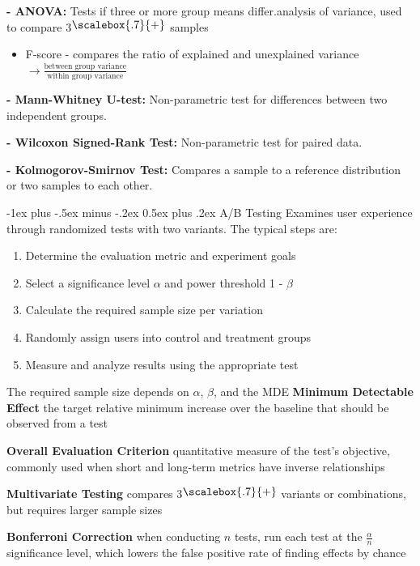 \documentclass[10pt,landscape]{article}
\makeatletter
\newcommand{\plus}{\raisebox{.3\height}{\scalebox{.7}{+}}}
\renewcommand{\section}{\@startsection{section}{1}{0mm}%
                                {-1ex plus -.5ex minus -.2ex}%
                                {0.5ex plus .2ex}%
                                {\normalfont\large\bfseries}}
\makeatother
\begin{document}
\begin{multicols}{3}
\textbf{- ANOVA:} Tests if three or more group means differ.analysis of variance, used to compare 3$\plus$ samples
\begin{itemize}[label={--},leftmargin=4mm]
    \itemsep -.6mm
    \item F-score - compares the ratio of explained and unexplained variance $\to \frac{\text{between group variance}}{\text{within group variance}}$
\end{itemize}

\textbf{- Mann-Whitney U-test:} Non-parametric test for differences between two independent groups.

\textbf{- Wilcoxon Signed-Rank Test:} Non-parametric test for paired data.

\textbf{- Kolmogorov-Smirnov Test:} Compares a sample to a reference distribution or two samples to each other.


\section{A/B Testing}
Examines user experience through randomized tests with two variants.
The typical steps are:
\begin{enumerate}[leftmargin=5mm]
    \itemsep -.4mm
    \item Determine the evaluation metric and experiment goals
    \item Select a significance level $\alpha$ and power threshold 1 - $\beta$
    \item Calculate the required sample size per variation
    \item Randomly assign users into control and treatment groups
    \item Measure and analyze results using the appropriate test
\end{enumerate}

The required sample size depends on $\alpha$, $\beta$, and the MDE
\textbf{Minimum Detectable Effect} the target relative minimum increase over the baseline that should be observed from a test
\vspace{.5mm}

\textbf{Overall Evaluation Criterion} quantitative measure of the test's objective, commonly used when short and long-term metrics have inverse relationships
\vspace{.7mm}

\textbf{Multivariate Testing} compares 3$\plus$ variants or combinations, but requires larger sample sizes

\textbf{Bonferroni Correction} when conducting $n$ tests,
run each test at the $\frac{\alpha}{n}$ significance level, which lowers the false positive rate of finding effects by chance
\vspace{.7mm}


\end{multicols}
\end{document}
